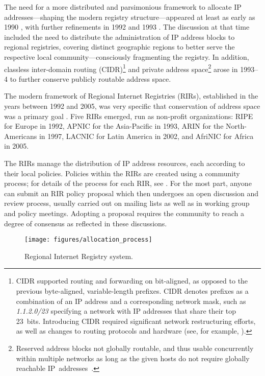 \documentclass[letter]{sigcomm-alternate}
\begin{document}
The need for a more distributed and parsimonious framework to allocate IP
addresses---shaping the modern registry structure---appeared at least as
early as 1990 \cite{rfc1174}, with further refinements in 1992 and 1993
\cite{rfc1466}. The discussion at that time included the need to distribute
the administration of IP address blocks to regional registries, covering
distinct geographic regions to better serve the respective local
community---consciously fragmenting the registry. In addition, classless 
inter-domain routing (CIDR)\footnote{
  CIDR \cite{rfc1519} supported routing and forwarding on bit-aligned, as
  opposed to the previous byte-aligned, variable-length prefixes.  CIDR
  denotes prefixes as a combination of an IP address and a corresponding
  network mask, such as \textit{1.1.2.0/23} specifying a network with
   IP addresses that share their top 23~bits.  Introducing CIDR
  required significant network restructuring efforts, as well as changes to
  routing protocols and hardware (see, for example,
  \cite{Ford:1993:IRA:2329084.2329983}).
} and private address space\footnote{
	Reserved address blocks not
	globally routable, and thus usable
	concurrently within multiple networks as long as the given
	hosts do not require globally reachable IP~addresses~\cite{rfc1597}.
}
arose in 1993--4 to further conserve publicly routable address space.

The modern framework of Regional Internet Registries (RIRs), established in the years between 1992 and
2005, was very specific that conservation of address space was a primary
goal \cite{rfc2050}.  Five RIRs emerged, run as non-profit organizations:
RIPE for Europe in 1992, APNIC for the Asia-Pacific in 1993, ARIN for the
North-Americans in 1997, LACNIC for Latin America in 2002, and AfriNIC for
Africa in 2005.

The RIRs manage the distribution of IP address resources, each according to
their local policies. Policies within the RIRs are created using a community
process; for details of the process for each RIR, see
\cite{arin_policymaking,apnic_policymaking,ripe_policymaking,afrinic_policymaking,lacnic_policymaking}.
For the most part, anyone can submit an RIR policy proposal
which then undergoes an open discussion and review process, usually carried out
on mailing lists as well as in working group and policy meetings.
Adopting a proposal requires the community to reach a degree of consensus as
reflected in these discussions. 

\begin{figure} \centering
\texttt{[image: figures/allocation\_process]}
\caption{Regional Internet Registry system.} 
\vspace{-1em}
\label{fig:rir_framework}
\end{figure}
\end{document}
